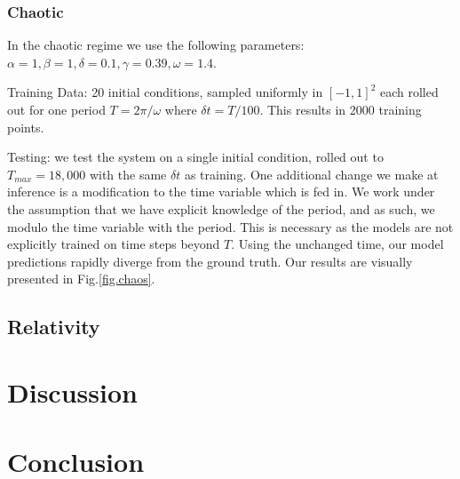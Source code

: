 \documentclass[twoside]{article}
\begin{document}
\subsubsection{Chaotic}

In the chaotic regime we use the following parameters:
$\alpha =1,\beta=1,\delta=0.1,\gamma=0.39,\omega=1.4$. 

Training Data: 20 initial conditions, sampled uniformly in $[-1,1]^2$ each rolled out for one period $T=2\pi/\omega$ where $\delta t = T/100$. This results in 2000 training points.

Testing: we test the system on a single initial condition, rolled out to $T_{max} = 18,000$ with the same $\delta t$ as training. One additional change we make at inference is a modification to the time variable which is fed in. We work under the assumption that we have explicit knowledge of the period, and as such, we modulo the time variable with the period. This is necessary as the models are not explicitly trained on time steps beyond $T$. Using the unchanged time, our model predictions rapidly diverge from the ground truth. Our results are visually presented in Fig.\ref{fig.chaos}.  
\subsection{Relativity}

\section{Discussion}

\section{Conclusion}



\begin{table}[ht!]
\caption{Test Rollout MSE} 
\centering %
\label{tab:tests}
\end{table}

\pagebreak


\end{document}
